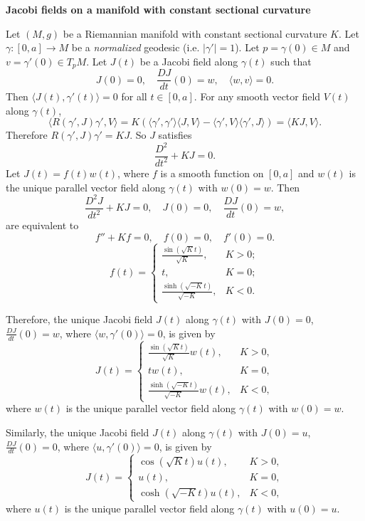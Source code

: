 \documentclass{amsart}
\numberwithin{equation}{section}
\theoremstyle{definition}
\theoremstyle{theorem}
\begin{document}
\noindent 
{\bf \large Jacobi fields on a manifold with constant sectional curvature}

Let $(M,g)$ be a Riemannian manifold with constant sectional curvature $K$.
Let $\gamma:[0,a]\to M$ be a {\em normalized} geodesic (i.e. $|\gamma'|=1$).
Let $p=\gamma(0)\in M$ and $v=\gamma'(0)\in T_p M$. Let $J(t)$ be a Jacobi field
along $\gamma(t)$ such that 
$$
J(0)=0, \quad \frac{DJ}{dt}(0)=w,\quad \langle w,v\rangle =0.
$$
Then $\langle J(t),\gamma'(t) \rangle =0$ for all $t\in [0,a]$. For any smooth
vector field $V(t)$ along $\gamma(t)$,
$$
\langle R(\gamma',J)\gamma',V\rangle = K(\langle \gamma',\gamma'\rangle \langle J,V\rangle
-\langle \gamma',V\rangle \langle \gamma', J\rangle) =\langle KJ,V\rangle.
$$
Therefore $R(\gamma',J)\gamma' = KJ$. So $J$ satisfies
$$
\frac{D^2}{dt^2} + KJ=0.
$$
Let $J(t)=f(t) w(t)$, where $f$ is a smooth function on $[0,a]$ and
$w(t)$ is the unique parallel vector field along $\gamma(t)$ with $w(0)=w$. Then
$$
\frac{D^2 J}{dt^2} + KJ =0,\quad J(0)=0,\quad \frac{DJ}{dt}(0)=w,
$$
are equivalent to
$$
f'' + Kf=0,\quad f(0)=0,\quad f'(0)=0.
$$
$$
f(t)=\begin{cases}
\frac{ \sin(\sqrt{K} t)}{\sqrt{K}}, & K>0;\\
t, & K=0;\\
\frac{ \sinh(\sqrt{-K} t)}{\sqrt{-K}}, & K<0.
\end{cases}
$$

Therefore, the unique Jacobi field $J(t)$ along $\gamma(t)$ with $J(0)=0$, $\frac{DJ}{dt}(0)=w$,
where $\langle w,\gamma'(0) \rangle =0$, is given by 
$$
J(t)=\begin{cases}
\frac{ \sin(\sqrt{K} t)}{\sqrt{K}}w(t), & K>0,\\
t w(t), & K=0,\\
\frac{ \sinh(\sqrt{-K} t)}{\sqrt{-K}} w(t), & K<0,
\end{cases}
$$
where $w(t)$ is the unique parallel vector field along $\gamma(t)$ with $w(0)=w$.

Similarly,
the unique Jacobi field $J(t)$ along $\gamma(t)$ with $J(0)=u$, $\frac{DJ}{dt}(0)=0$,
where $\langle u,\gamma'(0) \rangle =0$, is given by 
$$
J(t)=\begin{cases}
\cos(\sqrt{K} t)u(t), & K>0,\\
u(t), & K=0,\\
\cosh(\sqrt{-K} t) u(t), & K<0,
\end{cases}
$$
where $u(t)$ is the unique parallel vector field along $\gamma(t)$ with $u(0)=u$.


\bigskip
\end{document}
